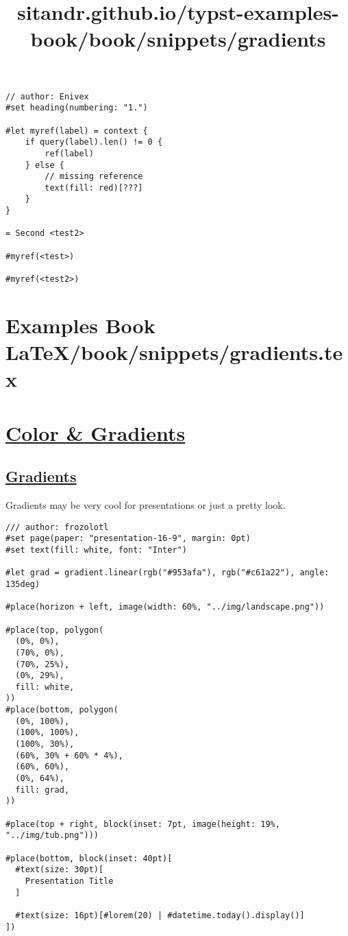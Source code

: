 \begin{verbatim}
// author: Enivex
#set heading(numbering: "1.")

#let myref(label) = context {
    if query(label).len() != 0 {
        ref(label)
    } else {
        // missing reference
        text(fill: red)[???]
    }
}

= Second <test2>

#myref(<test>)

#myref(<test2>)
\end{verbatim}

\pandocbounded{}


\section{Examples Book LaTeX/book/snippets/gradients.tex}
\title{sitandr.github.io/typst-examples-book/book/snippets/gradients}

\section{\texorpdfstring{\hyperref[color--gradients]{Color \&
Gradients}}{Color \& Gradients}}\label{color--gradients}

\subsection{\texorpdfstring{\hyperref[gradients]{Gradients}}{Gradients}}\label{gradients}

Gradients may be very cool for presentations or just a pretty look.

\begin{verbatim}
/// author: frozolotl
#set page(paper: "presentation-16-9", margin: 0pt)
#set text(fill: white, font: "Inter")

#let grad = gradient.linear(rgb("#953afa"), rgb("#c61a22"), angle: 135deg)

#place(horizon + left, image(width: 60%, "../img/landscape.png"))

#place(top, polygon(
  (0%, 0%),
  (70%, 0%),
  (70%, 25%),
  (0%, 29%),
  fill: white,
))
#place(bottom, polygon(
  (0%, 100%),
  (100%, 100%),
  (100%, 30%),
  (60%, 30% + 60% * 4%),
  (60%, 60%),
  (0%, 64%),
  fill: grad,
))

#place(top + right, block(inset: 7pt, image(height: 19%, "../img/tub.png")))

#place(bottom, block(inset: 40pt)[
  #text(size: 30pt)[
    Presentation Title
  ]

  #text(size: 16pt)[#lorem(20) | #datetime.today().display()]
])
\end{verbatim}

